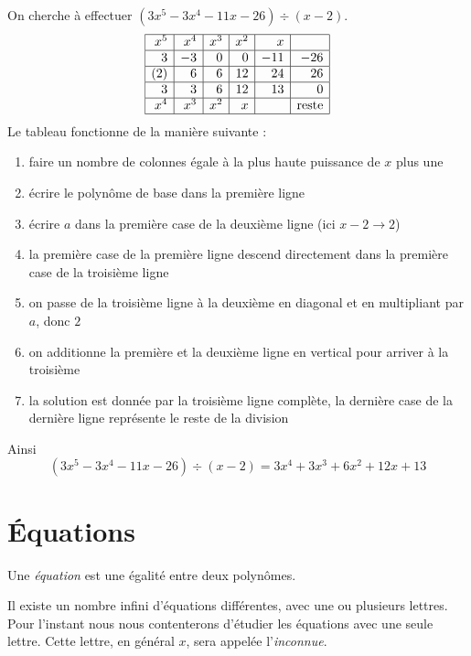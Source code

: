 \begin{exemple}
On cherche à effectuer $(3x^5 - 3x^4 -11x - 26)\div(x-2)$. 
$$
\begin{array}{|r|r|r|r|r|r|}
\hline
x^5 & x^4 & x^3 & x^2 & x & \\
\hline
3	&	-3	&	0	&	0	&	-11	&	-26	\\
\hline
(2)&	6	&	6	&	12	&	24	&	26	\\
\hline
3	&	3	&	6	&	12	&	13	&	0	\\
\hline
x^4 & x^3 & x^2 & x & & \mbox{reste} \\
\hline
\end{array}
$$
Le tableau fonctionne de la manière suivante :
\begin{enumerate}
\item faire un nombre de colonnes égale à la plus haute puissance de $x$ plus une
\item écrire le polynôme de base dans la première ligne
\item écrire $a$ dans la première case de la deuxième ligne (ici $x-2 \rightarrow 2$)
\item la première case de la première ligne descend directement dans la première case de la troisième ligne
\item on passe de la troisième ligne à la deuxième en diagonal et en multipliant par $a$, donc $2$
\item on additionne la première et la deuxième ligne en vertical pour arriver à la troisième
\item la solution est donnée par la troisième ligne complète, la dernière case de la dernière ligne représente le reste de la division
\end{enumerate}
Ainsi 
$$
(3x^5 - 3x^4 -11x - 26)\div(x-2) = 3x^4 + 3x^3 +6x^2 + 12x + 13
$$
\end{exemple}

\section{\'Equations}

\begin{definition}[\'Equation]
Une \emph{\'equation} est une égalité entre deux polynômes.
\end{definition}

Il existe un nombre infini d'équations différentes, avec une ou plusieurs lettres. Pour l'instant nous nous contenterons d'étudier les équations avec une seule lettre. Cette lettre, en général $x$, sera appelée l'\emph{inconnue}.

